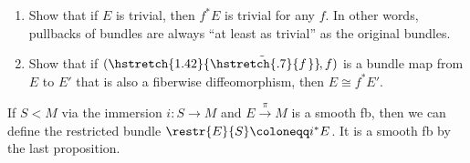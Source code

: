\documentclass[english,letterpaper]{article}%
\numberwithin{equation}{section}
\numberwithin{figure}{section}
\numberwithin{table}{section}
\theoremstyle{definition}
\theoremstyle{definition}
\theoremstyle{definition}
\theoremstyle{plain}
\theoremstyle{plain}
\theoremstyle{plain}
\theoremstyle{plain}
\theoremstyle{remark}
\theoremstyle{remark}
\newcommand\wt[1]{\hstretch{1.42}{\tilde{\hstretch{.7}{#1\mkern2mu}}}\mkern-2mu}
\begin{document}
\begin{xca}
\begin{enumerate}
    \item Show that if $E$ is trivial, then $f^\ast E$ is trivial for any $f$. In other words, pullbacks of bundles are always ``at least as trivial'' as the original bundles.
    \item Show that if $(\wt{f},f)$ is a bundle map from $E$ to $E'$ that is also a fiberwise diffeomorphism, then $E\cong f^\ast E'$.
\end{enumerate}
\end{xca}

\begin{defn}
    If $S< M$ via the immersion $i:S\to M$ and $E\overset{\pi}{\to}M$ is a smooth \gls{fb}, then we can define the restricted bundle $\restr{E}{S}\coloneqq i^\ast E$. It is a smooth \gls{fb} by the last proposition.
\end{defn}
\end{document}
